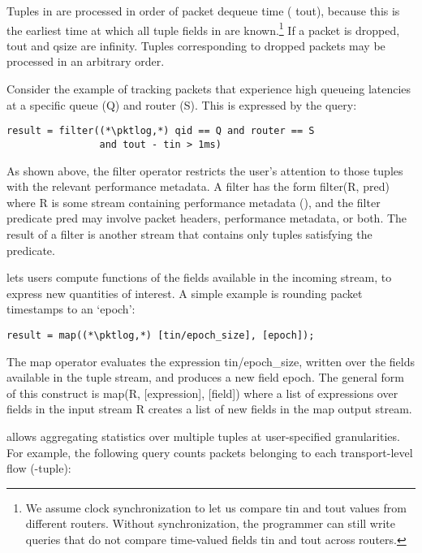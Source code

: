 Tuples in {\ct \pktlog} are processed in order of packet dequeue time ({\ct
tout}), because this is the earliest time at which all tuple fields in {\ct
\pktlog} are known.\footnote{We assume clock synchronization to let us compare
{\ctfoot tin} and {\ctfoot tout} values from different routers. Without
synchronization, the programmer can still write queries that do not compare
time-valued fields {\ctfoot tin} and {\ctfoot tout} across routers.} If a
packet is dropped, {\ct tout} and {\ct qsize} are {\ct infinity.} Tuples
corresponding to dropped packets may be processed in an arbitrary order.

 Consider the
example of tracking packets that experience high queueing latencies at a
specific queue ({\ct Q}) and router ({\ct S}). This is expressed by the query:

\begin{lstlisting}
result = filter((*\pktlog,*) qid == Q and router == S
                and tout - tin > 1ms)
\end{lstlisting}

As shown above, the {\ct filter} operator restricts the user's attention to
those tuples with the relevant performance metadata. A filter has the form {\ct
filter(R, pred)} where {\ct R} is some stream containing performance metadata
(\eg {\ct \pktlog}), and the filter predicate {\ct pred} may involve packet
headers, performance metadata, or both. The result of a {\ct filter} is another
stream that contains only tuples satisfying the predicate.

 \TheSystem lets users
compute functions of the fields available in the incoming stream, to express
new quantities of interest. A simple example is rounding packet timestamps to
an `epoch':

\begin{lstlisting}
result = map((*\pktlog,*) [tin/epoch_size], [epoch]);
\end{lstlisting}

The {\ct map} operator evaluates the expression {\ct tin/epoch\_size}, written
over the fields available in the tuple stream, and produces a new field {\ct
epoch}. The general form of this construct is {\ct map(R, [expression],
[field])} where a list of {\ct expression}s over fields in the input stream
{\ct R} creates a list of new {\ct field}s in the {\ct map} output stream.

 \TheSystem allows
aggregating statistics over multiple tuples at user-specified granularities.
For example, the following query counts packets belonging to each
transport-level flow (-tuple):

